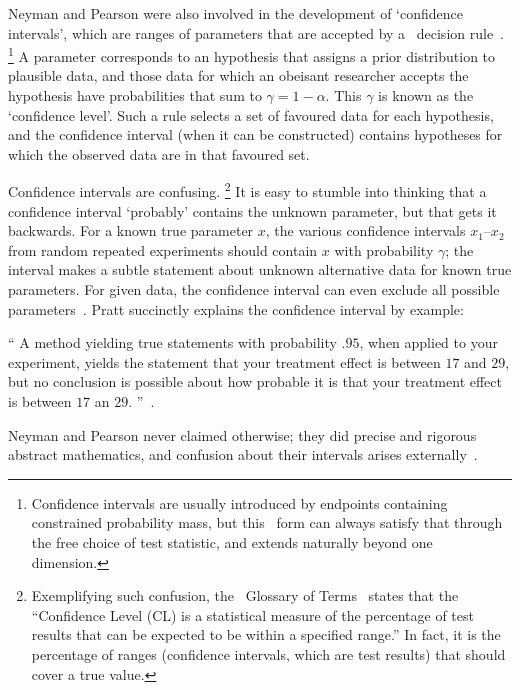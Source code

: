 Neyman and Pearson were also involved in the development of
`confidence intervals', which are ranges of parameters that are
accepted by a \pvalue\ decision rule~\cite{
clopper1934confidence,
neyman1935Intervals,
Neyman1937Outline
}.%
\footnote{%
Confidence intervals are usually introduced by endpoints containing constrained
probability mass, but this \pvalue\ form can always satisfy that through the
free choice of test statistic, and extends naturally beyond one dimension.%
}
A parameter corresponds to an hypothesis that assigns a prior distribution to
plausible data, and those data for which an obeisant researcher accepts the
hypothesis have probabilities that sum to $\gamma = 1 - \alpha$.
This $\gamma$ is known as the `confidence level'.
Such a rule selects a set of favoured data for each hypothesis, and the
confidence interval (when it can be constructed) contains hypotheses for which
the observed data are in that favoured set.

Confidence intervals are confusing.%
\footnote{%
Exemplifying such confusion,
the \atlas\ Glossary of Terms~\cite{atlas2022glossary} states that the
``Confidence Level (CL) is a statistical measure of the percentage of test
results that can be expected to be within a specified range.''
In fact, it is the percentage of ranges
(confidence intervals, which are test results)
that should cover a true value.%
}
It is easy to stumble into thinking that a confidence interval
`probably' contains the unknown parameter, but that gets it backwards.
For a known true parameter $x$, the various confidence intervals
$x_1\textrm{--}x_2$ from random repeated experiments should contain
$x$ with probability $\gamma$;
the interval makes a subtle statement about unknown alternative data for
known true parameters.
For given data, the confidence interval can even exclude all possible
parameters~\cite{
pratt1961testing,
Jaynes1976intervals
}.
Pratt succinctly explains the confidence interval by example:
\begin{displayquote}
\small
``%
A method yielding true statements with probability $.95$, when applied to your
experiment, yields the statement that your treatment effect is between $17$ and
$29$, but no conclusion is possible about how probable it is that your
treatment effect is between $17$ an $29$.%
''~\cite{pratt1961testing}.
\end{displayquote}
Neyman and Pearson never claimed otherwise; they did precise and rigorous
abstract mathematics, and confusion about their intervals arises
externally~\cite{jaynes2003probability}.

